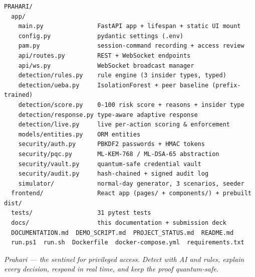 \documentclass[
]{article}
\begin{document}
\begin{verbatim}
PRAHARI/
  app/
    main.py               FastAPI app + lifespan + static UI mount
    config.py             pydantic settings (.env)
    pam.py                session-command recording + access review
    api/routes.py         REST + WebSocket endpoints
    api/ws.py             WebSocket broadcast manager
    detection/rules.py    rule engine (3 insider types, typed)
    detection/ueba.py     IsolationForest + peer baseline (prefix-trained)
    detection/score.py    0-100 risk score + reasons + insider type
    detection/response.py type-aware adaptive response
    detection/live.py     live per-action scoring & enforcement
    models/entities.py    ORM entities
    security/auth.py      PBKDF2 passwords + HMAC tokens
    security/pqc.py       ML-KEM-768 / ML-DSA-65 abstraction
    security/vault.py     quantum-safe credential vault
    security/audit.py     hash-chained + signed audit log
    simulator/            normal-day generator, 3 scenarios, seeder
  frontend/               React app (pages/ + components/) + prebuilt dist/
  tests/                  31 pytest tests
  docs/                   this documentation + submission deck
  DOCUMENTATION.md  DEMO_SCRIPT.md  PROJECT_STATUS.md  README.md
  run.ps1  run.sh  Dockerfile  docker-compose.yml  requirements.txt
\end{verbatim}

\emph{Prahari --- the sentinel for privileged access. Detect with AI and
rules, explain every decision, respond in real time, and keep the proof
quantum-safe.}
\end{document}
